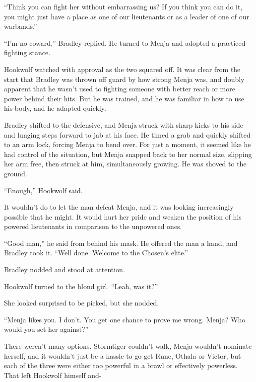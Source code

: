 ``Think you can fight her without embarrassing us?  If you think you can do it, you might just have a place as one of our lieutenants or as a leader of one of our warbands.''



``I'm no coward,'' Bradley replied.  He turned to Menja and adopted a practiced fighting stance.



Hookwolf watched with approval as the two squared off.  It was clear from the start that Bradley was thrown off guard by how strong Menja was, and doubly apparent that he wasn't used to fighting someone with better reach or more power behind their hits.  But he was trained, and he was familiar in how to use his body, and he adapted quickly.



Bradley shifted to the defensive, and Menja struck with sharp kicks to his side and lunging steps forward to jab at his face.  He timed a grab and quickly shifted to an arm lock, forcing Menja to bend over.  For just a moment, it seemed like he had control of the situation, but Menja snapped back to her normal size, slipping her arm free, then struck at him, simultaneously growing.  He was shoved to the ground.



``Enough,'' Hookwolf said.



It wouldn't do to let the man defeat Menja, and it was looking increasingly possible that he might.  It would hurt her pride and weaken the position of his powered lieutenants in comparison to the unpowered ones.



``Good man,'' he said from behind his mask.  He offered the man a hand, and Bradley took it.  ``Well done.  Welcome to the Chosen's elite.''



Bradley nodded and stood at attention.



Hookwolf turned to the blond girl. ``Leah, was it?''



She looked surprised to be picked, but she nodded.



``Menja likes you.  I don't.  You get one chance to prove me wrong.  Menja?  Who would you set her against?''



There weren't many options.  Stormtiger couldn't walk, Menja wouldn't nominate herself, and it wouldn't just be a hassle to go get Rune, Othala or Victor, but each of the three were either too powerful in a brawl or effectively powerless.  That left Hookwolf himself and-



